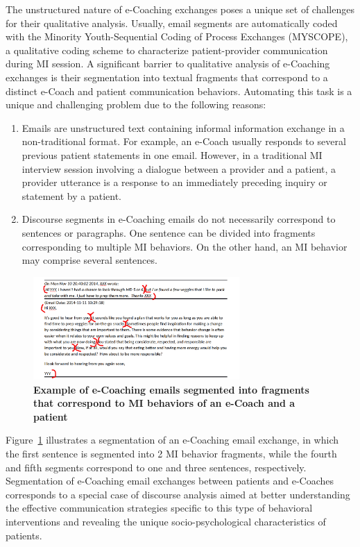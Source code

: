 \documentclass{amia}
\begin{document}
The unstructured nature of e-Coaching exchanges poses a unique set of challenges for their qualitative analysis. Usually, email segments are automatically coded with the Minority Youth-Sequential Coding of Process Exchanges (MYSCOPE), \cite{carcone2013provider} a qualitative coding scheme to characterize patient-provider communication during MI session. A significant barrier to qualitative analysis of e-Coaching exchanges is their segmentation into textual fragments that correspond to a distinct e-Coach and patient communication behaviors. Automating this task is a unique and challenging problem due to the following reasons:

\begin{enumerate}
\item Emails are unstructured text containing informal information exchange in a non-traditional format. For example, an e-Coach usually responds to several previous patient statements in one email. However, in a traditional MI interview session involving a dialogue between a provider and a patient, a provider utterance is a response to an immediately preceding inquiry or statement by a patient. 
\item Discourse segments in e-Coaching emails do not necessarily correspond to sentences or paragraphs. One sentence can be divided into fragments corresponding to multiple MI behaviors. On the other hand, an MI behavior may comprise several sentences.
\end{enumerate}

\begin{figure}[!htb]
    \centering
    \includegraphics[width=0.7\textwidth]{figures/segment-example.png}
    \caption{\textbf{Example of e-Coaching emails segmented into fragments that correspond to MI behaviors of an e-Coach and a patient}}
    \label{fig:text-segment}
\end{figure}

Figure~\ref{fig:text-segment} illustrates a segmentation of an e-Coaching email exchange, in which the first sentence is segmented into 2 MI behavior fragments, while the fourth and fifth segments correspond to one and three sentences, respectively. Segmentation of e-Coaching email exchanges between patients and e-Coaches corresponds to a special case of discourse analysis \cite{webber2012discourse} aimed at better understanding the effective communication strategies specific to this type of behavioral interventions and revealing the unique socio-psychological characteristics of patients. 
\end{document}
